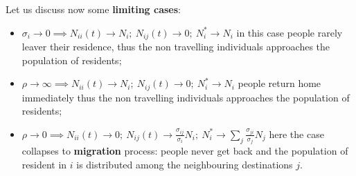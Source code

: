 \documentclass[../main/main.tex]{subfiles}
\begin{document}
Let us discuss now some \textbf{limiting cases}:
\begin{itemize}
    \item $\sigma_i \to 0 \implies N_{ii}(t) \to N_i;\ N_{ij}(t) \to 0;\ N_i^*\to N_i$ in this case people rarely leaver their residence, thus the non travelling individuals approaches the population of residents;
    \item $\rho \to \infty \implies N_{ii}(t) \to N_i;\ N_{ij}(t) \to 0;\ N_i^*\to N_i$ people return home immediately thus the non travelling individuals approaches the population of residents;
    \item $\rho \to 0 \implies N_{ii}(t) \to 0;\ N_{ij}(t) \to \frac{\sigma_{ij}}{\sigma_i}N_i;\ N_i^*\to \sum_j \frac{\sigma_{ji}}{\sigma_j} N_j$ here the case collapses to \textbf{migration} process: people never get back and the population of resident in $i$ is distributed among the neighbouring destinations $j$.
\end{itemize}
\end{document}
